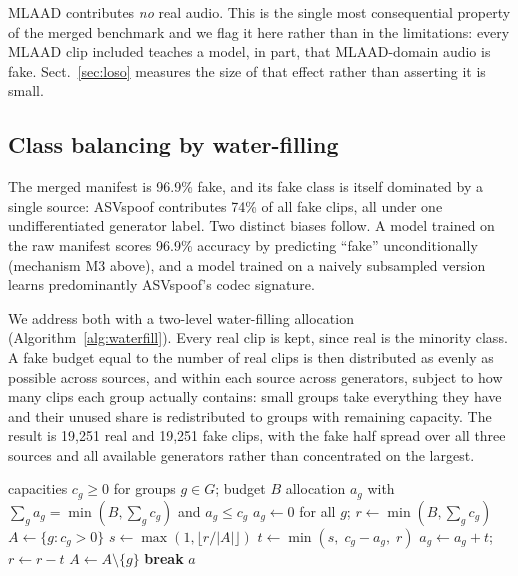 \documentclass[sn-mathphys-num,pdflatex]{sn-jnl}
\begin{document}
MLAAD contributes \emph{no} real audio. This is the single most consequential
property of the merged benchmark and we flag it here rather than in the
limitations: every MLAAD clip included teaches a model, in part, that
MLAAD-domain audio is fake. Sect.~\ref{sec:loso} measures the size of that
effect rather than asserting it is small.

\subsection{Class balancing by water-filling}\label{sec:waterfill}

The merged manifest is 96.9\% fake, and its fake class is itself dominated by a
single source: ASVspoof contributes 74\% of all fake clips, all under one
undifferentiated generator label. Two distinct biases follow. A model trained on
the raw manifest scores 96.9\% accuracy by predicting ``fake'' unconditionally
(mechanism M3 above), and a model trained on a naively subsampled version learns
predominantly ASVspoof's codec signature.

We address both with a two-level water-filling allocation
(Algorithm~\ref{alg:waterfill}). Every real clip is kept, since real is the
minority class. A fake budget equal to the number of real clips is then
distributed as evenly as possible across sources, and within each source across
generators, subject to how many clips each group actually contains: small groups
take everything they have and their unused share is redistributed to groups with
remaining capacity. The result is 19{,}251 real and 19{,}251 fake clips, with
the fake half spread over all three sources and all available generators rather
than concentrated on the largest.

\begin{algorithm}[t]
\caption{Water-filling allocation of a fixed budget over capacitated groups}
\label{alg:waterfill}
\begin{algorithmic}[1]
\Require capacities $c_g \ge 0$ for groups $g \in G$; budget $B$
\Ensure allocation $a_g$ with $\sum_g a_g = \min(B, \sum_g c_g)$ and $a_g \le c_g$
\State $a_g \gets 0$ for all $g$; \quad $r \gets \min(B, \sum_g c_g)$
\State $A \gets \{g : c_g > 0\}$ 
  \State $s \gets \max(1, \lfloor r / |A| \rfloor)$ 
    \State $t \gets \min(s,\; c_g - a_g,\; r)$
    \State $a_g \gets a_g + t$; \quad $r \gets r - t$
     $A \gets A \setminus \{g\}$ \EndIf
     \textbf{break} \EndIf
  \EndFor
\EndWhile
\State \Return $a$
\end{algorithmic}
\end{algorithm}
\end{document}
